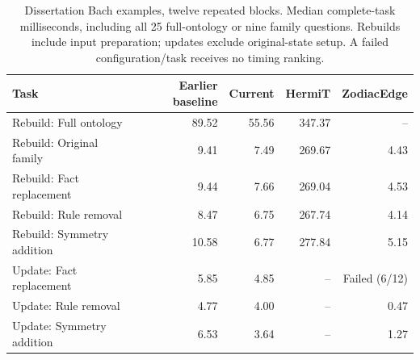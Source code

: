 \begin{table}[ht]
\caption{Dissertation Bach examples, twelve repeated blocks. Median complete-task milliseconds, including all 25 full-ontology or nine family questions. Rebuilds include input preparation; updates exclude original-state setup. A failed configuration/task receives no timing ranking.}
\label{tab:bach-comparison}
\centering\small
\begin{tabular}{@{}lrrrr@{}}
\toprule
Task & Earlier baseline & Current & HermiT & ZodiacEdge \\
\midrule
Rebuild: Full ontology & 89.52 & 55.56 & 347.37 & -- \\
Rebuild: Original family & 9.41 & 7.49 & 269.67 & 4.43 \\
Rebuild: Fact replacement & 9.44 & 7.66 & 269.04 & 4.53 \\
Rebuild: Rule removal & 8.47 & 6.75 & 267.74 & 4.14 \\
Rebuild: Symmetry addition & 10.58 & 6.77 & 277.84 & 5.15 \\
Update: Fact replacement & 5.85 & 4.85 & -- & Failed (6/12) \\
Update: Rule removal & 4.77 & 4.00 & -- & 0.47 \\
Update: Symmetry addition & 6.53 & 3.64 & -- & 1.27 \\
\bottomrule
\end{tabular}
\end{table}
